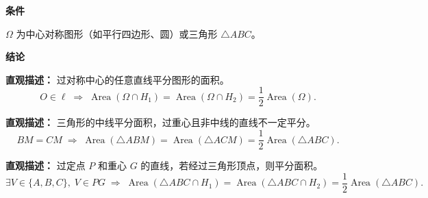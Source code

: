 \begin{statementbox}
	\textbf{\textcolor{CStatement}{条件}}
	\begin{description}[style=nextline, leftmargin=2.8em, labelsep=0.5em, itemsep=0.35em]
		\item[\textbf{\textcolor{CStatement}{条件 1（图形类型）：}}]
			$\Omega$ 为中心对称图形（如平行四边形、圆）或三角形 $\triangle ABC$。
	\end{description}
	\textbf{\textcolor{CStatement}{结论}}
	\begin{description}[style=nextline, leftmargin=2.8em, labelsep=0.5em, itemsep=0.45em]
		\item[\textbf{\textcolor{CStatement}{结论一（对称中心平分）：}}]
			\textbf{\textcolor{CStatement}{直观描述：}}
			过对称中心的任意直线平分图形的面积。
			\[
				O\in\ell \;\Rightarrow\; \operatorname{Area}(\Omega\cap H_1)=\operatorname{Area}(\Omega\cap H_2)=\frac12\operatorname{Area}(\Omega).
			\]
		\item[\textbf{\textcolor{CStatement}{结论二（三角形中线平分）：}}]
			\textbf{\textcolor{CStatement}{直观描述：}}
			三角形的中线平分面积，过重心且非中线的直线不一定平分。
			\[
				BM=CM \;\Rightarrow\; \operatorname{Area}(\triangle ABM)=\operatorname{Area}(\triangle ACM)=\frac12\operatorname{Area}(\triangle ABC).
			\]
		\item[\textbf{\textcolor{CStatement}{推广结论（重心判定法）：}}]
			\textbf{\textcolor{CStatement}{直观描述：}}
			过定点 $P$ 和重心 $G$ 的直线，若经过三角形顶点，则平分面积。
			\[
				\exists V\in\{A,B,C\},\; V\in PG\;\Rightarrow\; \operatorname{Area}(\triangle ABC\cap H_1)=\operatorname{Area}(\triangle ABC\cap H_2)=\frac12\operatorname{Area}(\triangle ABC).
			\]
	\end{description}

\end{statementbox}
